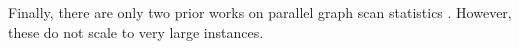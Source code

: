 Finally, there are only two prior works on parallel graph scan statistics \cite{cadena:bigdata17, zhao2016parallel}. However, these do not scale to very large instances.

